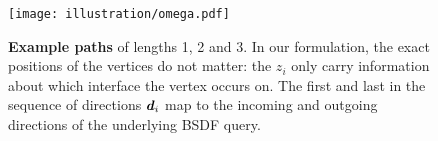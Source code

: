 \begin{figure}
	\centering
	\texttt{[image: illustration/omega.pdf]}
	\caption{\label{fig:singlelayer}
		\textbf{Example paths} of lengths 1, 2 and 3.
		In our formulation, the exact positions of the vertices do not matter: the $z_i$ only carry information about which interface the vertex occurs on.
		The first and last in the sequence of directions $\bm{d}_i$ map to the incoming and outgoing directions of the underlying BSDF query.
	}
\end{figure}